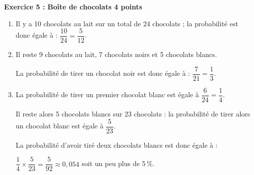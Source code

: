 \textbf{Exercice 5 : Boîte de chocolats \hfill 4 points}

\medskip

%
%

\begin{enumerate}
\item %
Il y a 10 chocolats au lait sur un total de 24 chocolats ; la probabilité est donc égale à : $\dfrac{10}{24} = \dfrac{5}{12}$.
\item %
Il reste 9 chocolats au lait, 7 chocolats noirs et 5 chocolats blancs.

La probabilité de tirer un chocolat noir est donc égale à : $\dfrac{7}{21} = \dfrac{1}{3}$.
\item %

La probabilité de tirer un premier chocolat blanc est égale à $\dfrac{6}{24} = \dfrac{1}{4}$.

Il reste alors 5 chocolats blancs sur 23 chocolats : la probabilité de tirer alors un chocolat blanc est égale à $\dfrac{5}{23}$.

La probabilité d’avoir tiré deux chocolats blancs est donc égale à :

$\dfrac{1}{4} \times \dfrac{5}{23} = \dfrac{5}{92} \approx 0,054$ soit un peu plus de 5\,\%.
\end{enumerate}

\vspace{0,5cm}

